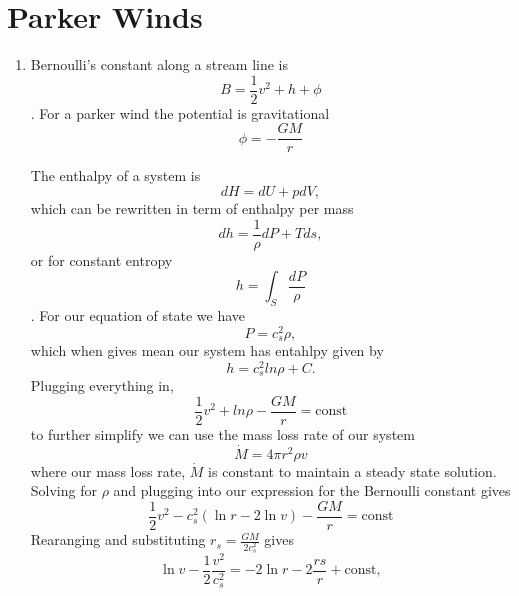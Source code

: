 \documentclass[11pt]{article}
\begin{document}
\section{Parker Winds}
\label{sec:org55482c9}
\begin{enumerate}[label=\alph*)]
 \item
  Bernoulli's constant along a stream line is
  \begin{equation}
   B = \frac{1}{2} v^{2} + h + \phi
  \end{equation}.
  For a parker wind the potential is gravitational
  \begin{equation}
   \phi = - \frac{GM}{r}
  \end{equation}

  The enthalpy of a system is
  \begin{equation}
   dH = dU + pdV,
  \end{equation}
  which can be rewritten in term of enthalpy per mass
  \begin{equation}
   dh = \frac{1}{\rho} dP + T ds,
  \end{equation}
  or for constant entropy
  \begin{equation}
   h = \int_{S} \frac{dP}{\rho}
  \end{equation}.
  For our equation of state we have
  \begin{equation}
   P = c_s^2 \rho,
  \end{equation}
  which when gives mean our system has entahlpy given by
  \begin{equation}
   h = c_s^2 ln \rho + C.
  \end{equation}
  Plugging everything in,
  \begin{equation}
    \frac{1}{2} v^2 + ln \rho - \frac{G M}{r} = \text{const}
  \end{equation}
  to further simplify we can use the mass loss rate of our system
  \begin{equation}
   \dot{M} = 4 \pi r^2 \rho v
  \end{equation}
  where our mass loss rate, $\dot{M}$ is constant to maintain a steady state solution.
  Solving for $\rho$ and plugging into our expression for the Bernoulli constant gives
  \begin{equation}
    \frac{1}{2} v^2 - c_s^2(\ln r - 2 \ln v)  - \frac{G M}{r} = \text{const}
  \end{equation}
  Rearanging and substituting $r_s = \frac{GM}{2c_s^2}$ gives
  \begin{equation}
   \ln v - \frac{1}{2} \frac{v^2}{c_s^2} = - 2 \ln r - 2 \frac{rs}{r} + \text{const},

\end{equation}
\end{enumerate}
\end{document}
